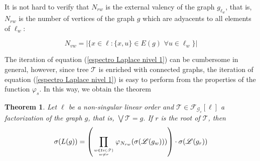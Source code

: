 \documentclass[11pt]{article}
\newtheorem{theorem}{Theorem}[section]
\theoremstyle{definition}
\begin{document}
It is not hard to verify that $N_{rw}$ is the external valency of the graph $g_{\ell_w}$, that is, $N_{rw}$ is the number of vertices of the graph $g$ which are adyacents to all elements of $\ell_w$:

\[N_{vw}=|\{x\in \ell : \{x, u\}\in E(g)\,\, \forall u\in \ell_w\}|\]

The iteration of equation (\ref{espectro Laplace nivel 1}) can be cumbersome in general, however, since tree $\mathscr{T}$ is enriched with connected graphs, the iteration of equation (\ref{espectro Laplace nivel 1}) is easy to perform from the properties of the function $\varphi_s$. In this way, we obtain the theorem

\begin{theorem}\label{Laplacian spectrum iterated}
Let $\ell$ be a non-singular linear order and $\mathscr{T}\in \mathscr{F}_{\mathscr{G}_c}[\ell]$ a factorization of the graph $g$, that is, $\displaystyle{\bigvee \mathscr{T}=g}$. If $r$ is the root of $\mathscr{T}$, then
\begin{equation}\label{lapaciano iterado}\sigma(L(g))=\left(\prod_{w\in \mathrm{Iv}(\mathscr{T})\atop w\neq r} \varphi_{N_{rw}}(\sigma(\mathscr{L}(g_w)))\right)\cdot \sigma(\mathscr{L}(g_r))\end{equation}
\end{theorem}
\end{document}

